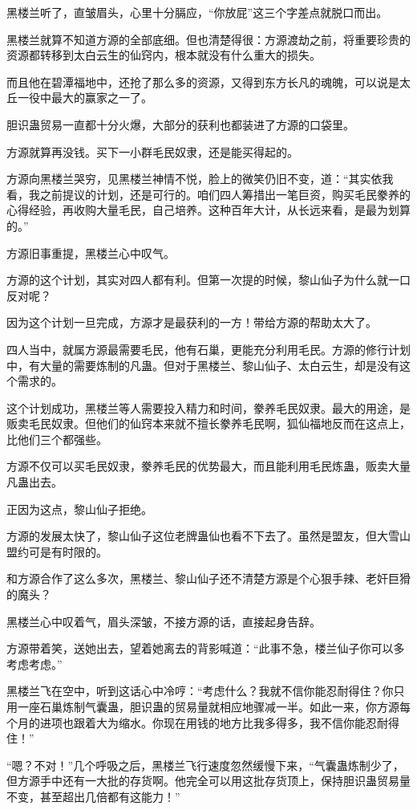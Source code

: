 \begin{this_body}
黑楼兰听了，直皱眉头，心里十分膈应，“你放屁”这三个字差点就脱口而出。

黑楼兰就算不知道方源的全部底细。但也清楚得很：方源渡劫之前，将重要珍贵的资源都转移到太白云生的仙窍内，根本就没有什么重大的损失。

而且他在碧潭福地中，还抢了那么多的资源，又得到东方长凡的魂魄，可以说是太丘一役中最大的赢家之一了。

胆识蛊贸易一直都十分火爆，大部分的获利也都装进了方源的口袋里。

方源就算再没钱。买下一小群毛民奴隶，还是能买得起的。

方源向黑楼兰哭穷，见黑楼兰神情不悦，脸上的微笑仍旧不变，道：“其实依我看，我之前提议的计划，还是可行的。咱们四人筹措出一笔巨资，购买毛民豢养的心得经验，再收购大量毛民，自己培养。这种百年大计，从长远来看，是最为划算的。”

方源旧事重提，黑楼兰心中叹气。

方源的这个计划，其实对四人都有利。但第一次提的时候，黎山仙子为什么就一口反对呢？

因为这个计划一旦完成，方源才是最获利的一方！带给方源的帮助太大了。

四人当中，就属方源最需要毛民，他有石巢，更能充分利用毛民。方源的修行计划中，有大量的需要炼制的凡蛊。但对于黑楼兰、黎山仙子、太白云生，却是没有这个需求的。

这个计划成功，黑楼兰等人需要投入精力和时间，豢养毛民奴隶。最大的用途，是贩卖毛民奴隶。但他们的仙窍本来就不擅长豢养毛民啊，狐仙福地反而在这点上，比他们三个都强些。

方源不仅可以买毛民奴隶，豢养毛民的优势最大，而且能利用毛民炼蛊，贩卖大量凡蛊出去。

正因为这点，黎山仙子拒绝。

方源的发展太快了，黎山仙子这位老牌蛊仙也看不下去了。虽然是盟友，但大雪山盟约可是有时限的。

和方源合作了这么多次，黑楼兰、黎山仙子还不清楚方源是个心狠手辣、老奸巨猾的魔头？

黑楼兰心中叹着气，眉头深皱，不接方源的话，直接起身告辞。

方源带着笑，送她出去，望着她离去的背影喊道：“此事不急，楼兰仙子你可以多考虑考虑。”

黑楼兰飞在空中，听到这话心中冷哼：“考虑什么？我就不信你能忍耐得住？你只用一座石巢炼制气囊蛊，胆识蛊的贸易量就相应地骤减一半。如此一来，你方源每个月的进项也跟着大为缩水。你现在用钱的地方比我多得多，我不信你能忍耐得住！”

“嗯？不对！”几个呼吸之后，黑楼兰飞行速度忽然缓慢下来，“气囊蛊炼制少了，但方源手中还有一大批的存货啊。他完全可以用这批存货顶上，保持胆识蛊贸易量不变，甚至超出几倍都有这能力！”


\end{this_body}
